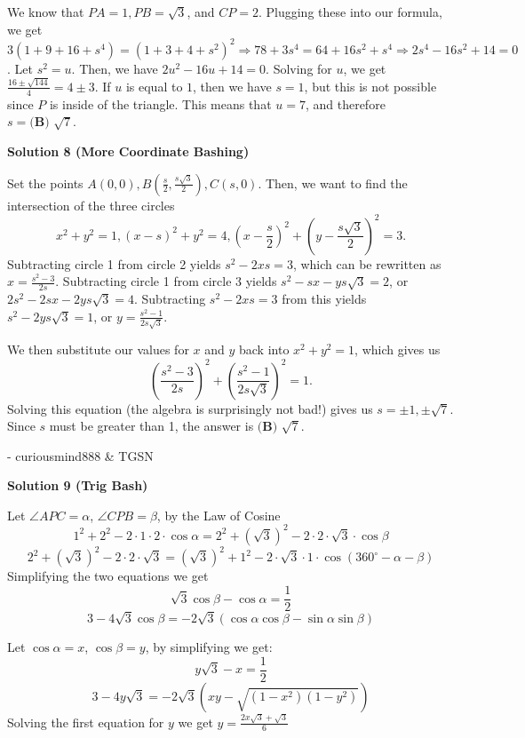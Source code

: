 \begin{enumerate}
We know that $PA=1, PB=\sqrt{3}$, and $CP=2$. Plugging these into our formula, we get $3(1+9+16+s^4)=(1+3+4+s^2)^2 \Rightarrow 78 + 3s^4=64+16s^2+s^4 \Rightarrow 2s^4-16s^2+14=0$. Let $s^2=u$. Then, we have $2u^2-16u+14=0$. Solving for $u$, we get $\frac{16 \pm \sqrt{144}}{4} = 4 \pm 3$. If $u$ is equal to $1$, then we have $s=1$, but this is not possible since $P$ is inside of the triangle. This means that $u=7$, and therefore $s=\boxed{\textbf{(B) } \sqrt{7}}$.

 



\textbf{Solution 8 (More Coordinate Bashing)}

Set the points $A(0,0), B\left(\frac{s}{2},\frac{s\sqrt{3}}{2}\right), C(s,0)$. Then, we want to find the intersection of the three circles 
 \[x^2+y^2=1, (x-s)^2+y^2=4, \left(x-\frac{s}{2}\right)^2+\left(y-\frac{s\sqrt{3}}{2}\right)^2=3.\] Subtracting circle 1 from circle 2 yields $s^2-2xs=3$, which can be rewritten as $x=\frac{s^2-3}{2s}$. Subtracting circle 1 from circle 3 yields $s^2-sx-ys\sqrt{3}=2$, or $2s^2-2sx-2ys\sqrt{3}=4$. Subtracting $s^2-2xs=3$ from this yields $s^2-2ys\sqrt{3}=1$, or $y=\frac{s^2-1}{2s\sqrt{3}}$.

 We then substitute our values for $x$ and $y$ back into $x^2+y^2=1$, which gives us 
 \[\left(\frac{s^2-3}{2s}\right)^2+\left(\frac{s^2-1}{2s\sqrt{3}}\right)^2=1.\]Solving this equation (the algebra is surprisingly not bad!) gives us $s=\pm1,\pm\sqrt{7}$. Since $s$ must be greater than 1, the answer is $\boxed{\textbf{(B) } \sqrt{7}}$.

 - curiousmind888 & TGSN

 



\textbf{Solution 9 (Trig Bash)}

Let $\angle APC = \alpha$, $\angle CPB = \beta$, by the Law of Cosine
 \[1^2+2^2 - 2 \cdot 1 \cdot 2 \cdot \cos \alpha = 2^2 + (\sqrt{3})^2 - 2 \cdot 2 \cdot \sqrt{3} \cdot \cos \beta\]
 \[2^2 + (\sqrt{3})^2 - 2 \cdot 2 \cdot \sqrt{3} = (\sqrt{3})^2 + 1^2 - 2 \cdot \sqrt{3} \cdot 1 \cdot \cos (360^{\circ} - \alpha - \beta)\]Simplifying the two equations we get
 \[\sqrt{3} \cos \beta - \cos \alpha = \frac12\]
 \[3 - 4 \sqrt{3} \cos \beta = - 2 \sqrt{3} ( \cos \alpha \cos \beta - \sin \alpha \sin \beta )\]

 Let $\cos \alpha = x$, $\cos \beta = y$, by simplifying we get:
 \[y\sqrt{3} - x = \frac12\]
 \[3-4y\sqrt{3} = -2\sqrt{3} \left( xy - \sqrt{ (1-x^2)(1-y^2) } \right)\]Solving the first equation for $y$ we get $y = \frac{ 2x \sqrt{3} + \sqrt{3} }{6}$


\end{enumerate}

